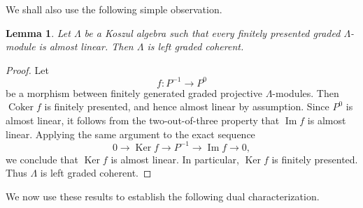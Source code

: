 \documentclass[11pt]{article}
\newtheorem{lemma}[theorem]{Lemma}
\theoremstyle{definition}
\theoremstyle{remark}
\begin{document}
We shall also use the following simple observation.

\begin{lemma}
Let \(\Lambda\) be a Koszul algebra such that every finitely presented graded
\(\Lambda\)-module is almost linear. Then \(\Lambda\) is left graded coherent.
\end{lemma}

\begin{proof}
Let
\[
f\colon P^{-1}\longrightarrow P^{0}
\]
be a morphism between finitely generated graded projective \(\Lambda\)-modules. Then
\(\operatorname{Coker} f\) is finitely presented, and hence almost linear by assumption.
Since \(P^{0}\) is almost linear, it follows from the two-out-of-three property that
\(\operatorname{Im} f\) is almost linear. Applying the same argument to the exact sequence
\[
0\longrightarrow \operatorname{Ker} f
\longrightarrow P^{-1}
\longrightarrow \operatorname{Im} f
\longrightarrow 0,
\]
we conclude that \(\operatorname{Ker} f\) is almost linear. In particular,
\(\operatorname{Ker} f\) is finitely presented. Thus \(\Lambda\) is left graded coherent.
\end{proof}
We now use these results to establish the following dual characterization.
\end{document}
